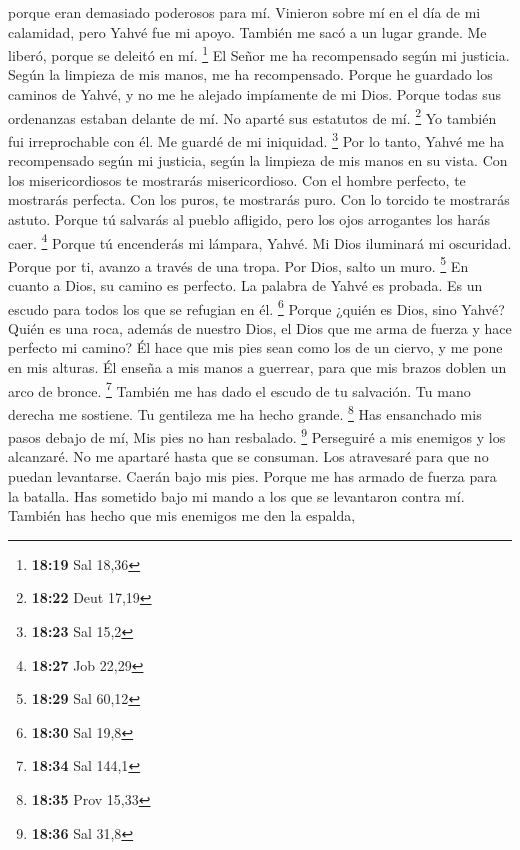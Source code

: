 \begin{paracol}{2}
porque eran demasiado poderosos para mí.  Vinieron sobre
mí en el día de mi calamidad, pero Yahvé fue mi apoyo. 
También me sacó a un lugar grande. Me liberó, porque se deleitó en mí.
\footnote{\textbf{18:19} Sal 18,36}  El Señor me ha
recompensado según mi justicia. Según la limpieza de mis manos, me ha
recompensado.  Porque he guardado los caminos de Yahvé, y
no me he alejado impíamente de mi Dios.  Porque todas sus
ordenanzas estaban delante de mí. No aparté sus estatutos de mí.
\footnote{\textbf{18:22} Deut 17,19}  Yo también fui
irreprochable con él. Me guardé de mi iniquidad. \footnote{\textbf{18:23}
  Sal 15,2}  Por lo tanto, Yahvé me ha recompensado según
mi justicia, según la limpieza de mis manos en su vista. 
Con los misericordiosos te mostrarás misericordioso. Con el hombre
perfecto, te mostrarás perfecta.  Con los puros, te
mostrarás puro. Con lo torcido te mostrarás astuto. 
Porque tú salvarás al pueblo afligido, pero los ojos arrogantes los
harás caer. \footnote{\textbf{18:27} Job 22,29}  Porque
tú encenderás mi lámpara, Yahvé. Mi Dios iluminará mi oscuridad.
 Porque por ti, avanzo a través de una tropa. Por Dios,
salto un muro. \footnote{\textbf{18:29} Sal 60,12}  En
cuanto a Dios, su camino es perfecto. La palabra de Yahvé es probada. Es
un escudo para todos los que se refugian en él. \footnote{\textbf{18:30}
  Sal 19,8}  Porque ¿quién es Dios, sino Yahvé? Quién es
una roca, además de nuestro Dios,  el Dios que me arma de
fuerza y hace perfecto mi camino?  Él hace que mis pies
sean como los de un ciervo, y me pone en mis alturas.  Él
enseña a mis manos a guerrear, para que mis brazos doblen un arco de
bronce. \footnote{\textbf{18:34} Sal 144,1}  También me
has dado el escudo de tu salvación. Tu mano derecha me sostiene. Tu
gentileza me ha hecho grande. \footnote{\textbf{18:35} Prov 15,33}
 Has ensanchado mis pasos debajo de mí, Mis pies no han
resbalado. \footnote{\textbf{18:36} Sal 31,8}  Perseguiré
a mis enemigos y los alcanzaré. No me apartaré hasta que se consuman.
 Los atravesaré para que no puedan levantarse. Caerán
bajo mis pies.  Porque me has armado de fuerza para la
batalla. Has sometido bajo mi mando a los que se levantaron contra mí.
 También has hecho que mis enemigos me den la espalda,

\end{paracol}
